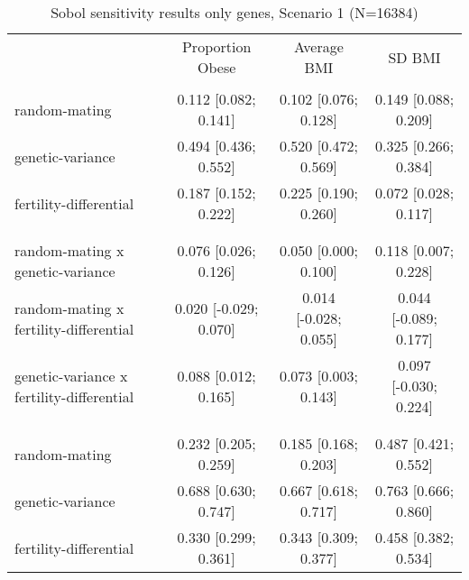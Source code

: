 
\begin{table}[htp]
\renewcommand{\arraystretch}{1.3}
\setlength{\tabcolsep}{5pt}
\caption{Sobol sensitivity results only genes, Scenario 1 (N=16384)}
\label{tab:sobol-snp}
\footnotesize
\centering
\begin{threeparttable}
\begin{tabular}{lccc}
\hline
\addlinespace
& Proportion Obese & Average BMI & SD BMI \\
\addlinespace
\hline
\addlinespace[6pt]
\multicolumn{4}{l}{\hspace{1em} S1} \\
\hspace{1.5em} random-mating & 0.112 [0.082; 0.141]   & 0.102 [0.076; 0.128]   & 0.149 [0.088; 0.209] \\
	  \hspace{1.5em} genetic-variance & 0.494 [0.436; 0.552]   & 0.520 [0.472; 0.569]   & 0.325 [0.266; 0.384] \\
	  \hspace{1.5em} fertility-differential & 0.187 [0.152; 0.222]   & 0.225 [0.190; 0.260]   & 0.072 [0.028; 0.117] \\
	 \\
\addlinespace[12pt]
\multicolumn{4}{l}{\hspace{1em} S2} \\ 
\hspace{1.5em} random-mating x genetic-variance & 0.076 [0.026; 0.126]   & 0.050 [0.000; 0.100]   & 0.118 [0.007; 0.228] \\
	  \hspace{1.5em} random-mating x fertility-differential & 0.020 [-0.029; 0.070]   & 0.014 [-0.028; 0.055]   & 0.044 [-0.089; 0.177] \\
	  \hspace{1.5em} genetic-variance x fertility-differential & 0.088 [0.012; 0.165]   & 0.073 [0.003; 0.143]   & 0.097 [-0.030; 0.224] \\
	 \\
\addlinespace[12pt]
\multicolumn{4}{l}{\hspace{1em} ST} \\ 
\hspace{1.5em} random-mating & 0.232 [0.205; 0.259]   & 0.185 [0.168; 0.203]   & 0.487 [0.421; 0.552] \\
	  \hspace{1.5em} genetic-variance & 0.688 [0.630; 0.747]   & 0.667 [0.618; 0.717]   & 0.763 [0.666; 0.860] \\
	  \hspace{1.5em} fertility-differential & 0.330 [0.299; 0.361]   & 0.343 [0.309; 0.377]   & 0.458 [0.382; 0.534] \\

\end{tabular}
\end{threeparttable}
\end{table}
